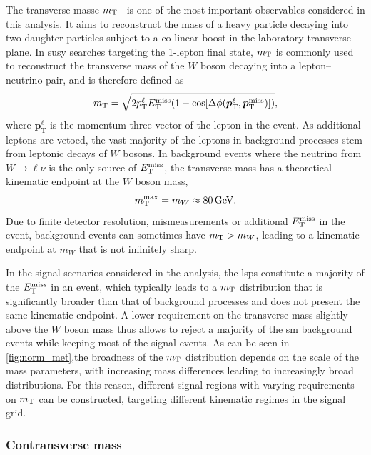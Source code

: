 The transverse masse $m_{\textrm{T}}$~\cite{Arnison:1983rp,transversemass:163856} is one of the most important observables considered in this analysis. It aims to reconstruct the mass of a heavy particle decaying into two daughter particles subject to a co-linear boost in the laboratory transverse plane. In \gls{susy} searches targeting the 1-lepton final state, $m_{\textrm{T}}$ is commonly used to reconstruct the transverse mass of the $W$ boson decaying into a lepton--neutrino pair, and is therefore defined as
\begin{equation}
	m_{\textrm{T}} = \sqrt{2p_{\textrm{T}}^\ell E_{\textrm{T}}^{\textrm{miss}}(1-\cos[\Delta\phi(\boldsymbol{p}_\mathrm{T}^\ell,\boldsymbol{p}_\mathrm{T}^\mathrm{miss})])},
\end{equation}
where $\boldsymbol{p}_\mathrm{T}^\ell$ is the momentum three-vector of the lepton in the event. As additional leptons are vetoed, the vast majority of the leptons in background processes stem from leptonic decays of $W$ bosons. In background events where the neutrino from $W\rightarrow\ell\nu$ is the only source of $E_{\textrm{T}}^{\textrm{miss}}$, the transverse mass has a theoretical kinematic endpoint at the $W$ boson mass, 
\begin{equation}
	\mt^\mathrm{max} = m_W \approx \SI{80}{\GeV}.
\end{equation}
Due to finite detector resolution, mismeasurements or additional $E_{\textrm{T}}^{\textrm{miss}}$ in the event, background events can sometimes have $m_{\textrm{T}} > m_W$, leading to a kinematic endpoint at $m_W$ that is not infinitely sharp.

In the signal scenarios considered in the analysis, the \glspl{lsp} constitute a majority of the $E_{\textrm{T}}^{\textrm{miss}}$ in an event, which typically leads to a $m_{\textrm{T}}$ distribution that is significantly broader than that of background processes and does not present the same kinematic endpoint. A lower requirement on the transverse mass slightly above the $W$ boson mass thus allows to reject a majority of the \gls{sm} background events while keeping most of the signal events. As can be seen in \cref{fig:norm_met},the broadness of the $m_{\textrm{T}}$ distribution depends on the scale of the mass parameters, with increasing mass differences leading to increasingly broad distributions. For this reason, different signal regions with varying requirements on $m_{\textrm{T}}$ can be constructed, targeting different kinematic regimes in the signal grid.

\subsubsection{Contransverse mass}

